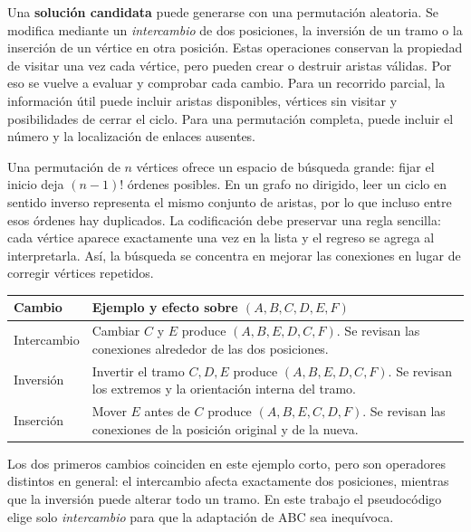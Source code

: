 \documentclass[11pt,letterpaper]{article}
\begin{document}
Una \textbf{solución candidata} puede generarse con una permutación aleatoria. Se modifica mediante un \emph{intercambio} de dos posiciones, la inversión de un tramo o la inserción de un vértice en otra posición. Estas operaciones conservan la propiedad de visitar una vez cada vértice, pero pueden crear o destruir aristas válidas. Por eso se vuelve a evaluar y comprobar cada cambio. Para un recorrido parcial, la información útil puede incluir aristas disponibles, vértices sin visitar y posibilidades de cerrar el ciclo. Para una permutación completa, puede incluir el número y la localización de enlaces ausentes.

Una permutación de $n$ vértices ofrece un espacio de búsqueda grande: fijar el inicio deja $(n-1)!$ órdenes posibles. En un grafo no dirigido, leer un ciclo en sentido inverso representa el mismo conjunto de aristas, por lo que incluso entre esos órdenes hay duplicados. La codificación debe preservar una regla sencilla: cada vértice aparece exactamente una vez en la lista y el regreso se agrega al interpretarla. Así, la búsqueda se concentra en mejorar las conexiones en lugar de corregir vértices repetidos.

\begin{center}
\small
\begin{tabular}{p{2.5cm}p{10.0cm}}
\toprule
\textbf{Cambio} & \textbf{Ejemplo y efecto sobre $(A,B,C,D,E,F)$}\\
\midrule
Intercambio & Cambiar $C$ y $E$ produce $(A,B,E,D,C,F)$. Se revisan las conexiones alrededor de las dos posiciones.\\
Inversión & Invertir el tramo $C,D,E$ produce $(A,B,E,D,C,F)$. Se revisan los extremos y la orientación interna del tramo.\\
Inserción & Mover $E$ antes de $C$ produce $(A,B,E,C,D,F)$. Se revisan las conexiones de la posición original y de la nueva.\\
\bottomrule
\end{tabular}
\end{center}

Los dos primeros cambios coinciden en este ejemplo corto, pero son operadores distintos en general: el intercambio afecta exactamente dos posiciones, mientras que la inversión puede alterar todo un tramo. En este trabajo el pseudocódigo elige solo \emph{intercambio} para que la adaptación de ABC sea inequívoca.
\end{document}
